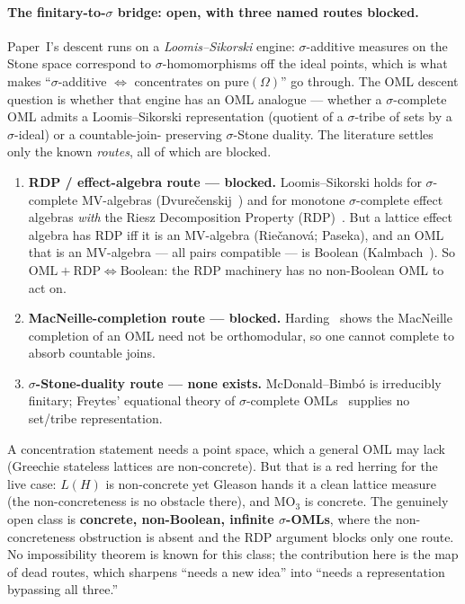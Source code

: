 \documentclass[11pt]{article}
\theoremstyle{definition}
\newcommand{\pure}{\mathrm{pure}}
\begin{document}
\paragraph{The finitary-to-$\sigma$ bridge: open, with three named
routes blocked.}
Paper~I's descent runs on a \emph{Loomis--Sikorski} engine:
$\sigma$-additive measures on the Stone space correspond to
$\sigma$-homomorphisms off the ideal points, which is what makes
``$\sigma$-additive $\Leftrightarrow$ concentrates on
$\pure(\Omega)$'' go through.  The OML descent question is whether
that engine has an OML analogue --- whether a $\sigma$-complete OML
admits a Loomis--Sikorski representation (quotient of a
$\sigma$-tribe of sets by a $\sigma$-ideal) or a countable-join-
preserving $\sigma$-Stone duality.  The literature settles only the
known \emph{routes}, all of which are blocked.
\begin{enumerate}[label=(\roman*), noitemsep]
  \item \textbf{RDP / effect-algebra route --- blocked.}
    Loomis--Sikorski holds for $\sigma$-complete MV-algebras
    (Dvure\v{c}enskij~\cite{Dvurecenskij2000}) and for monotone
    $\sigma$-complete effect algebras \emph{with} the Riesz
    Decomposition Property (RDP)~\cite{Dvurecenskij2005}.  But a
    lattice effect algebra has RDP iff it is an MV-algebra
    (Rie\v{c}anov\'{a}; Paseka), and an OML that is an MV-algebra ---
    all pairs compatible --- is Boolean (Kalmbach~\cite{Kalmbach1983}).
    So $\text{OML} + \text{RDP} \Leftrightarrow \text{Boolean}$: the
    RDP machinery has no non-Boolean OML to act on.
  \item \textbf{MacNeille-completion route --- blocked.}
    Harding~\cite{Harding1991} shows the MacNeille completion of an
    OML need not be orthomodular, so one cannot complete to absorb
    countable joins.
  \item \textbf{$\sigma$-Stone-duality route --- none exists.}
    McDonald--Bimb\'{o} is irreducibly finitary; Freytes' equational
    theory of $\sigma$-complete OMLs~\cite{Freytes2020} supplies no
    set/tribe representation.
\end{enumerate}
A concentration statement needs a point space, which a general OML
may lack (Greechie stateless lattices are non-concrete).  But that is
a red herring for the live case: $L(H)$ is non-concrete yet Gleason
hands it a clean lattice measure (the non-concreteness is no obstacle
there), and $\mathrm{MO}_3$ is concrete.  The genuinely open class is
\textbf{concrete, non-Boolean, infinite $\sigma$-OMLs}, where the
non-concreteness obstruction is absent and
the RDP argument blocks only one route.  No impossibility theorem is
known for this class; the contribution here is the map of dead routes,
which sharpens ``needs a new idea'' into ``needs a representation
bypassing all three.''
\end{document}
